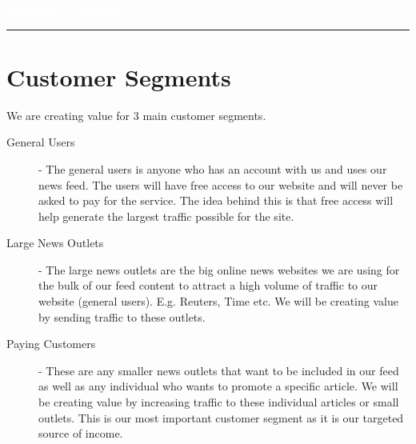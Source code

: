 \documentclass[11pt]{article}
\author{%
    	\textbf{Katharine Cooney}\\
    \texttt{katharine.cooney@ucdconnect.ie}\vspace{10pt} \\
       \textbf{ Liam Creagh}\\
    \texttt{liam.creagh@ucdconnect.ie}\vspace{10pt} \\
        \textbf{James Doolan}\\
    \texttt{james.doolan@ucdconnect.ie}\vspace{10pt} \\
        \textbf{Shuyu Huang}\\
    \texttt{shuyu.huang@ucdconnect.ie}\vspace{10pt} \\
       \textbf{ Kang Li}\\
    \texttt{kang.li@ucdconnect.ie}
    }
\makeatletter
\def\printauthor{%
    {\large \@author}}
\makeatother
\begin{document}
\begin{titlepage}
\BgThispage
{}
\vspace*{0.4\textheight}
\noindent
\textcolor{white}{\Huge\textbf{\textsf{Business Proposition}}}
\vspace*{2cm}\par
\noindent
\begin{minipage}{0.55\linewidth}
    \begin{flushright}
        \printauthor
    \end{flushright}
\end{minipage} \hspace{30pt}
%
\begin{minipage}{0.02\linewidth}
    \rule{1pt}{175pt}
\end{minipage} \hspace{-10pt}
%
\begin{minipage}{0.63\linewidth}
\vspace{5pt}

\end{minipage}
\end{titlepage}
\restoregeometry


\section{Customer Segments}

We are creating value for 3 main customer segments.

\begin{description}
\item[General Users] - The general users is anyone who has an account with us and uses our news feed. The users will have free access to our website and will never be asked to pay for the service. The idea behind this is that free access will help generate the largest traffic possible for the site.
 
\item[Large News Outlets] - The large news outlets are the big online news websites we are using for the bulk of our feed content to attract a high volume of traffic to our website (general users).  E.g. Reuters, Time etc. We will be creating value by sending traffic to these outlets.

\item[Paying Customers] - These are any smaller news outlets that want to be included in our feed as well as any individual who wants to promote a specific article. We will be creating value by increasing traffic to these individual articles or small outlets. This is our most important customer segment as it is our targeted source of income.
\end{description}
\end{document}
